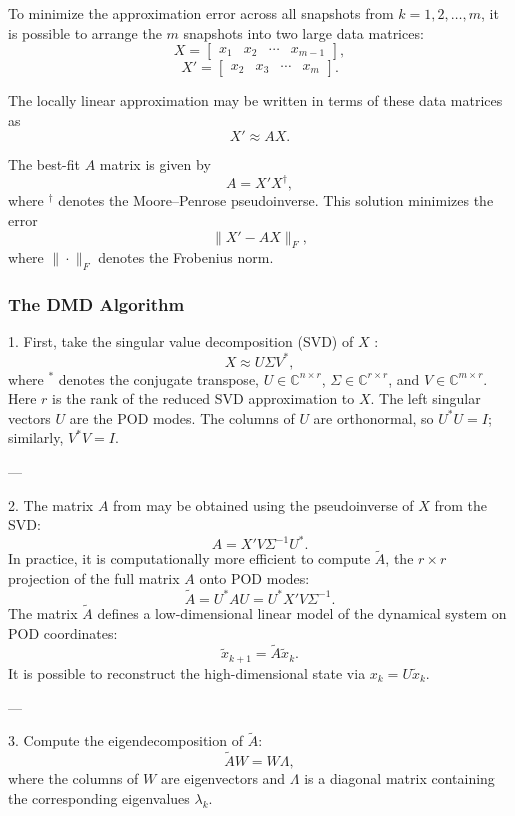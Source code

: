 \documentclass{article}
\begin{document}
To minimize the approximation error across all snapshots from 
$k = 1,2,\dots,m$, it is possible to arrange the $m$ snapshots into two large data matrices:
\[
X =
\begin{bmatrix}
x_1 & x_2 & \cdots & x_{m-1}
\end{bmatrix},
\]
\[
X' =
\begin{bmatrix}
x_2 & x_3 & \cdots & x_m
\end{bmatrix}.
\]

The locally linear approximation may be written in terms of these data matrices as
\[
X' \approx A X.
\]

The best-fit $A$ matrix is given by
\[
A = X' X^{\dagger},
\]
where ${}^\dagger$ denotes the Moore--Penrose pseudoinverse. This solution minimizes the error
\[
\| X' - A X \|_F,
\]
where $\|\cdot\|_F$ denotes the Frobenius norm.

\vspace{1cm}

\subsubsection*{The DMD Algorithm}

\vspace{1cm}

1. First, take the singular value decomposition (SVD) of $X$ :
\[
X \approx U \Sigma V^*,
\]
where ${}^*$ denotes the conjugate transpose, 
$U \in \mathbb{C}^{n \times r}$, 
$\Sigma \in \mathbb{C}^{r \times r}$, 
and $V \in \mathbb{C}^{m \times r}$.  
Here $r$ is the rank of the reduced SVD approximation to $X$.  
The left singular vectors $U$ are the POD modes.  
The columns of $U$ are orthonormal, so $U^* U = I$; similarly, $V^* V = I$.

---

2. The matrix $A$ from may be obtained using the pseudoinverse of $X$ from the SVD:
\[
A = X' V \Sigma^{-1} U^*.
\]
In practice, it is computationally more efficient to compute $\tilde{A}$, the $r \times r$ 
projection of the full matrix $A$ onto POD modes:
\[
\tilde{A} = U^* A U = U^* X' V \Sigma^{-1}.
\]
The matrix $\tilde{A}$ defines a low-dimensional linear model of the dynamical system 
on POD coordinates:
\[
\tilde{x}_{k+1} = \tilde{A} \tilde{x}_k.
\]
It is possible to reconstruct the high-dimensional state via $x_k = U \tilde{x}_k$.

---

3. Compute the eigendecomposition of $\tilde{A}$:
\[
\tilde{A} W = W \Lambda,
\]
where the columns of $W$ are eigenvectors and $\Lambda$ is a diagonal matrix 
containing the corresponding eigenvalues $\lambda_k$.
\end{document}
